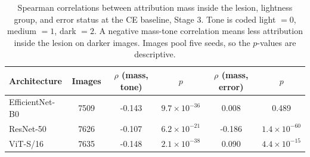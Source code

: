 \documentclass[11pt]{article}
\begin{document}
\begin{table}[t]
\centering
\small
\caption{Quantitative XAI at the CE baseline on the HAM10000 test split, Stage 3. Grad-CAM targets the true class. Each architecture uses five seeds and all 1,527 test images per seed; $n$ counts image evaluations summed over seeds. Attribution mass is the fraction of the heatmap inside the lesion mask. Values are means across seeds.}
\label{tab:xai}
\end{table}

\begin{table}[t]
\centering
\small
\caption{Spearman correlations between attribution mass inside the lesion, lightness group, and error status at the CE baseline, Stage 3. Tone is coded light $=0$, medium $=1$, dark $=2$. A negative mass-tone correlation means less attribution inside the lesion on darker images. Images pool five seeds, so the $p$-values are descriptive.}
\label{tab:xaicorr}
\begin{tabular}{lccccc}
\toprule
Architecture & Images & $\rho$ (mass, tone) & $p$ & $\rho$ (mass, error) & $p$ \\
\midrule
EfficientNet-B0 & 7509 & -0.143 & $9.7\times10^{-36}$ & 0.008 & 0.489 \\
ResNet-50 & 7626 & -0.107 & $6.2\times10^{-21}$ & -0.186 & $1.4\times10^{-60}$ \\
ViT-S/16 & 7635 & -0.148 & $2.1\times10^{-38}$ & 0.090 & $4.4\times10^{-15}$ \\
\bottomrule
\end{tabular}
\end{table}
\end{document}
